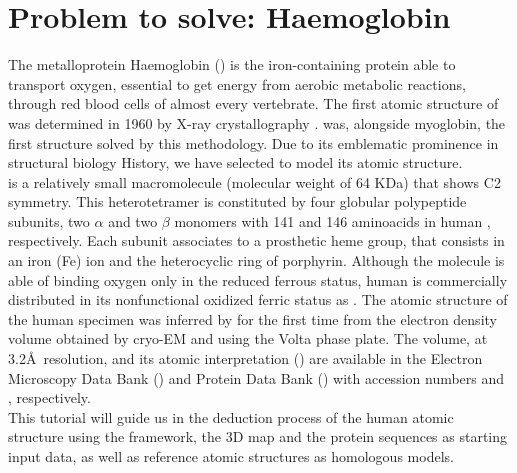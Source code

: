 
\section{Problem to solve: Haemoglobin}

The metalloprotein Haemoglobin () is the iron-containing protein able to transport oxygen, essential to get energy from aerobic metabolic reactions, through red blood cells of almost every vertebrate. The first atomic structure of  was determined in 1960 by X-ray crystallography \citep{perutz1960}.  was, alongside myoglobin, the first structure solved by this methodology. Due to its emblematic prominence in structural biology History, we have selected  to model its atomic structure.\\

 is a relatively small macromolecule (molecular weight of 64 KDa) that shows C2 symmetry. This heterotetramer is constituted by four globular polypeptide subunits, two $\alpha$ and two $\beta$ monomers with 141 and 146 aminoacids in human , respectively. Each subunit associates to a prosthetic heme group, that consists in an iron (Fe) ion and the heterocyclic ring of porphyrin. Although the molecule is able of binding oxygen only in the reduced ferrous status, human  is commercially distributed in its nonfunctional oxidized ferric status as . The atomic structure of the human  specimen was inferred by \citet{khoshouei2017} for the first time from the electron density volume obtained by cryo-EM and using the Volta phase plate. The volume, at 3.2\AA\ resolution, and its atomic interpretation () are available in the Electron Microscopy Data Bank () and Protein Data Bank () with accession numbers  and , respectively.\\

This tutorial will guide us in the deduction process of the human  atomic structure using the \scipion framework, the 3D map and the protein sequences as starting input data, as well as reference atomic structures as homologous models. %
